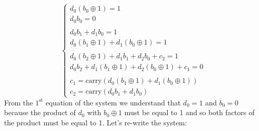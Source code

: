 \documentclass[11pt, a4paper]{article}
\begin{document}
\begin{equation*}
    \begin{cases}
        
        d_0(b_0\oplus1)=1\\
        d_0b_0=0\\\\
        
        d_0b_1+d_1b_0=1\\
        d_0(b_1\oplus1)+d_1(b_0\oplus1)=1\\\\
        
        d_0(b_2\oplus1)+d_1b_1+d_2b_0+c_2=1\\
        d_0b_2+d_1(b_1\oplus1)+d_2(b_0\oplus1)+c_1=0\\\\

        c_1=\text{carry}(d_0(b_1\oplus1)+d_1(b_0\oplus1))\\
        c_2=\text{carry}(d_0b_1+d_1b_0)
        
    \end{cases}
\end{equation*}
From the $1^{\text{st}}$ equation of the system we understand that $d_0=1$ and $b_0=0$ because the product of $d_0$ with $b_0\oplus1$ must be equal to 1 and so both factors of the product must be equal to 1. Let's re-write the system:
\end{document}
